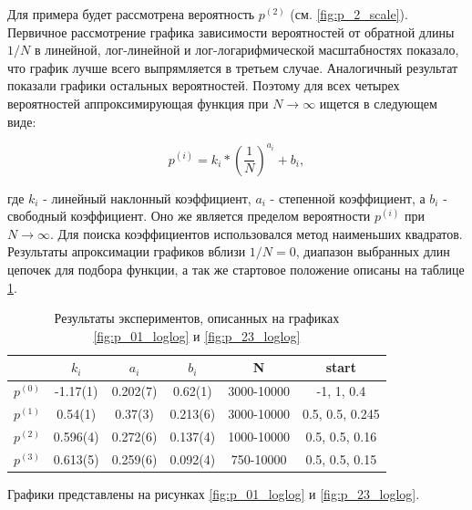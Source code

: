 Для примера будет рассмотрена вероятность $p^{(2)}$ (см. \ref{fig:p_2_scale}). 
Первичное рассмотрение графика зависимости вероятностей от обратной длины $1/N$ в линейной, лог-линейной и лог-логарифмической масштабностях показало, что график лучше всего выпрямляется в третьем случае. 
Аналогичный результат показали графики остальных вероятностей.
Поэтому для всех четырех вероятностей аппроксимирующая функция при $N \to \infty$ ищется в следующем виде:

\begin{equation}
p^{(i)} = k_i * (\frac{1}{N})^{a_i} + b_i,
\end{equation}

где $k_i$ - линейный наклонный коэффициент, $a_i$ - степенной коэффициент, а $b_i$ - свободный коэффициент. 
Оно же является пределом вероятности $p^{(i)}$ при $N \to \infty$.
Для поиска коэффициентов использовался метод наименьших квадратов.
Результаты апроксимации графиков вблизи $1/N = 0$, диапазон выбранных длин цепочек для подбора функции,
а так же стартовое положение описаны на таблице \ref{tab:p_i_log_log}. 

\begin{table}[h] 
\centering
\begin{tabular}{|c|c|c|c|c|c|}
\hline
 & $k_i$ & $a_i$ & $b_i$ & N & start  \\ \hline
$p^{(0)}$ & -1.17(1) & 0.202(7) & 0.62(1) & 3000-10000 & -1, 1, 0.4 \\ \hline 
$p^{(1)}$ & 0.54(1) & 0.37(3) & 0.213(6) & 3000-10000 & 0.5, 0.5, 0.245 \\ \hline
$p^{(2)}$ & 0.596(4) & 0.272(6) & 0.137(4) & 1000-10000 & 0.5, 0.5, 0.16 \\ \hline
$p^{(3)}$ & 0.613(5) & 0.259(6) & 0.092(4) & 750-10000 & 0.5, 0.5, 0.15 \\ \hline
\end{tabular}
\caption{Результаты экспериментов, описанных на графиках \ref{fig:p_01_loglog} и \ref{fig:p_23_loglog}}
\label{tab:p_i_log_log}
\end{table}

Графики представлены на рисунках \ref{fig:p_01_loglog} и \ref{fig:p_23_loglog}.

